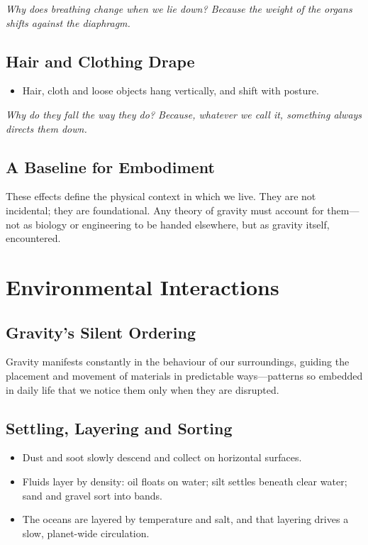 \documentclass[11pt,a4paper]{article}
\newcommand{\why}[1]{\par\textit{#1}\par}
\begin{document}
\why{Why does breathing change when we lie down? Because the weight of the organs shifts against the diaphragm.}

\subsection{Hair and Clothing Drape}

\begin{itemize}
  \item Hair, cloth and loose objects hang vertically, and shift with posture.
\end{itemize}

\why{Why do they fall the way they do? Because, whatever we call it, something always directs them down.}

\subsection{A Baseline for Embodiment}

These effects define the physical context in which we live. They are not incidental; they are foundational. Any theory of gravity must account for them---not as biology or engineering to be handed elsewhere, but as gravity itself, encountered.

\section{Environmental Interactions}

\subsection{Gravity's Silent Ordering}

Gravity manifests constantly in the behaviour of our surroundings, guiding the placement and movement of materials in predictable ways---patterns so embedded in daily life that we notice them only when they are disrupted.

\subsection{Settling, Layering and Sorting}

\begin{itemize}
  \item Dust and soot slowly descend and collect on horizontal surfaces.
  \item Fluids layer by density: oil floats on water; silt settles beneath clear water; sand and gravel sort into bands.
  \item The oceans are layered by temperature and salt, and that layering drives a slow, planet-wide circulation.
\end{itemize}
\end{document}
